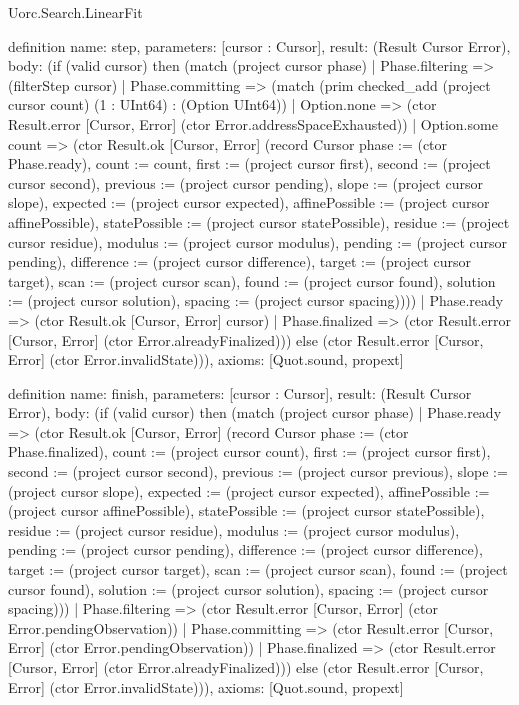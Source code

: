 \begin{lexlean}{Uorc.Search.LinearFit}
\begin{semanticmodule}
definition{
  name: step,
  parameters: [cursor : Cursor],
  result: (Result Cursor Error),
  body: (if (valid cursor) then (match (project cursor phase)
    | Phase.filtering => (filterStep cursor)
    | Phase.committing => (match (prim checked_add (project cursor count) (1 : UInt64) : (Option UInt64))
      | Option.none => (ctor Result.error [Cursor, Error] (ctor Error.addressSpaceExhausted))
      | Option.some count => (ctor Result.ok [Cursor, Error] (record Cursor {phase := (ctor Phase.ready), count := count, first := (project cursor first), second := (project cursor second), previous := (project cursor pending), slope := (project cursor slope), expected := (project cursor expected), affinePossible := (project cursor affinePossible), statePossible := (project cursor statePossible), residue := (project cursor residue), modulus := (project cursor modulus), pending := (project cursor pending), difference := (project cursor difference), target := (project cursor target), scan := (project cursor scan), found := (project cursor found), solution := (project cursor solution), spacing := (project cursor spacing)})))
    | Phase.ready => (ctor Result.ok [Cursor, Error] cursor)
    | Phase.finalized => (ctor Result.error [Cursor, Error] (ctor Error.alreadyFinalized))) else (ctor Result.error [Cursor, Error] (ctor Error.invalidState))),
  axioms: [Quot.sound, propext]
}

definition{
  name: finish,
  parameters: [cursor : Cursor],
  result: (Result Cursor Error),
  body: (if (valid cursor) then (match (project cursor phase)
    | Phase.ready => (ctor Result.ok [Cursor, Error] (record Cursor {phase := (ctor Phase.finalized), count := (project cursor count), first := (project cursor first), second := (project cursor second), previous := (project cursor previous), slope := (project cursor slope), expected := (project cursor expected), affinePossible := (project cursor affinePossible), statePossible := (project cursor statePossible), residue := (project cursor residue), modulus := (project cursor modulus), pending := (project cursor pending), difference := (project cursor difference), target := (project cursor target), scan := (project cursor scan), found := (project cursor found), solution := (project cursor solution), spacing := (project cursor spacing)}))
    | Phase.filtering => (ctor Result.error [Cursor, Error] (ctor Error.pendingObservation))
    | Phase.committing => (ctor Result.error [Cursor, Error] (ctor Error.pendingObservation))
    | Phase.finalized => (ctor Result.error [Cursor, Error] (ctor Error.alreadyFinalized))) else (ctor Result.error [Cursor, Error] (ctor Error.invalidState))),
  axioms: [Quot.sound, propext]
}


\end{semanticmodule}
\end{lexlean}
